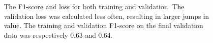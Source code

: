         \clearpage
        \begin{figure}[H]
            \centering
            \qquad
            \caption[Loss and F1 score during training]{The F1-score and loss for both training and validation. The validation loss was calculated less often, resulting in larger jumps in value. The training and validation F1-score on the final validation data was respectively 0.63 and 0.64.}%
            \label{loss_f1_duo_plot_fig}%
        \end{figure}
            
